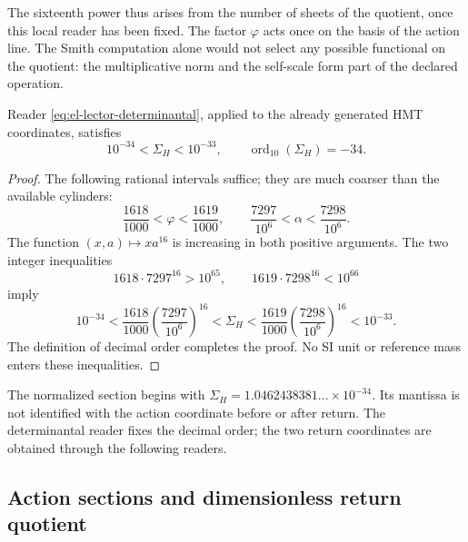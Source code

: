 The sixteenth power thus arises from the number of sheets of the quotient,
once this local reader has been fixed. The factor \(\varphi\) acts once on
the basis of the action line. The Smith computation alone would not
select any possible functional on the quotient: the multiplicative
norm and the self-scale form part of the declared operation.

\begin{theorem}
Reader \eqref{eq:el-lector-determinantal}, applied to the already generated
HMT coordinates, satisfies
\begin{equation}
 10^{-34}<\Sigma_H<10^{-33},\qquad
 \operatorname{ord}_{10}(\Sigma_H)=-34.
 \label{eq:el-decada}
\end{equation}
\end{theorem}
\begin{proof}
\label{md:accion:intervalos}
The following rational intervals suffice; they are much coarser than the available
cylinders:
\[
 \frac{1618}{1000}<\varphi<\frac{1619}{1000},\qquad
 \frac{7297}{10^6}<\alpha<\frac{7298}{10^6}.
\]
The function \((x,a)\mapsto xa^{16}\) is increasing in both positive
arguments. The two integer inequalities
\[
 1618\cdot7297^{16}>10^{65},\qquad
 1619\cdot7298^{16}<10^{66}
\]
imply
\[
 10^{-34}
 <\frac{1618}{1000}\left(\frac{7297}{10^6}\right)^{16}
 <\Sigma_H
 <\frac{1619}{1000}\left(\frac{7298}{10^6}\right)^{16}
 <10^{-33}.
\]
The definition of decimal order completes the proof. No SI
unit or reference mass enters these inequalities.
\end{proof}

The normalized section begins with
\(\Sigma_H=1.0462438381\ldots\times10^{-34}\). Its mantissa is not
identified with the action coordinate before or after return.
The determinantal reader fixes the decimal order; the two return
coordinates are obtained through the following readers.


\subsection{Action sections and dimensionless return quotient}

